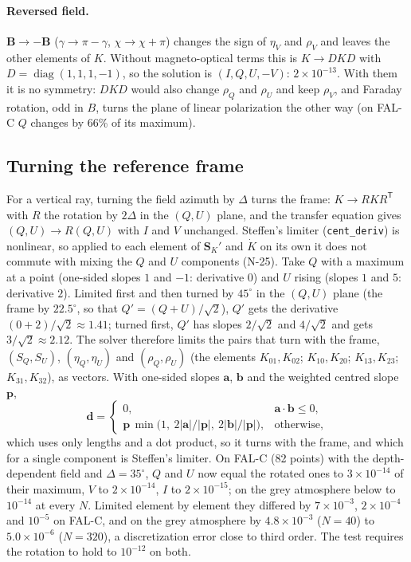 \documentclass[11pt,a4paper]{article}
\newcommand{\code}[1]{\texttt{#1}}
\newcommand{\vS}{\boldsymbol{S}}
\begin{document}
\paragraph{Reversed field.} $\boldsymbol B\to-\boldsymbol B$
($\gamma\to\pi-\gamma$, $\chi\to\chi+\pi$) changes the sign of $\eta_V$
and $\rho_V$ and leaves the other elements of $K$. Without magneto-optical
terms this is $K\to DKD$ with $D=\operatorname{diag}(1,1,1,-1)$, so the
solution is $(I,Q,U,-V)$: $2\times10^{-13}$. With them it is no symmetry:
$DKD$ would also change $\rho_Q$ and $\rho_U$ and keep $\rho_V$, and
Faraday rotation, odd in $B$, turns the plane of linear polarization the
other way (on FAL-C $Q$ changes by 66\% of its maximum).

\subsection{Turning the reference frame}
For a vertical ray, turning the field azimuth by $\Delta$ turns the frame:
$K\to RKR^{\mathsf T}$ with $R$ the rotation by $2\Delta$ in the $(Q,U)$
plane, and the transfer equation gives $(Q,U)\to R(Q,U)$ with $I$ and $V$
unchanged. Steffen's limiter (\code{cent\_deriv}) is nonlinear, so
applied to each element of $\vS_K'$ and $\dot K$ on its own it does not
commute with mixing the $Q$ and $U$ components (N-25). Take $Q$ with a
maximum at a point (one-sided slopes $1$ and $-1$: derivative $0$) and $U$
rising (slopes $1$ and $5$: derivative $2$). Limited first and then turned
by $45^\circ$ in the $(Q,U)$ plane (the frame by $22.5^\circ$, so that
$Q'=(Q+U)/\sqrt2$), $Q'$ gets the derivative $(0+2)/\sqrt2\approx1.41$; turned
first, $Q'$ has slopes $2/\sqrt2$ and $4/\sqrt2$ and gets $3/\sqrt2\approx2.12$.
The solver therefore limits the pairs that turn with the frame,
$(S_Q,S_U)$, $(\eta_Q,\eta_U)$ and $(\rho_Q,\rho_U)$ (the elements
$K_{01},K_{02}$; $K_{10},K_{20}$; $K_{13},K_{23}$; $K_{31},K_{32}$), as
vectors. With one-sided slopes $\mathbf a$, $\mathbf b$ and the weighted
centred slope $\mathbf p$,
\begin{equation}
\mathbf d = \begin{cases}
0, & \mathbf a\cdot\mathbf b \le 0,\\
\mathbf p\,\min\bigl(1,\ 2|\mathbf a|/|\mathbf p|,\ 2|\mathbf b|/|\mathbf p|\bigr), & \text{otherwise},
\end{cases}
\end{equation}
which uses only lengths and a dot product, so it turns with the frame, and
which for a single component is Steffen's limiter. On FAL-C (82 points)
with the depth-dependent field and $\Delta = 35^\circ$, $Q$ and $U$ now
equal the rotated ones to $3\times10^{-14}$ of their maximum, $V$ to
$2\times10^{-14}$, $I$ to $2\times10^{-15}$; on the grey atmosphere below
to $10^{-14}$ at every $N$. Limited element by element they differed by
$7\times10^{-3}$, $2\times10^{-4}$ and $10^{-5}$ on FAL-C, and on the grey
atmosphere by $4.8\times10^{-3}$ ($N=40$) to $5.0\times10^{-6}$ ($N=320$),
a discretization error close to third order. The test requires the
rotation to hold to $10^{-12}$ on both.
\end{document}
